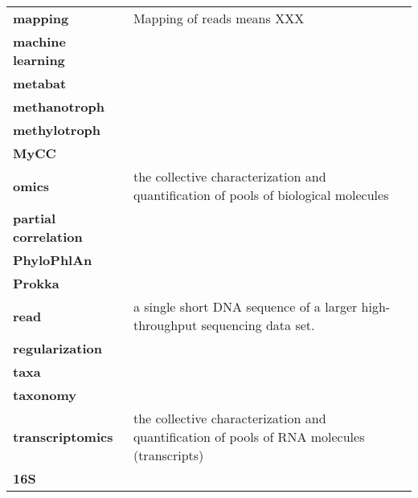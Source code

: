 \begin{longtable}{ p{}  p{} }
\textbf{mapping} & Mapping of reads means XXX \\
\textbf{machine learning} &  \\
\textbf{metabat} &  \\
\textbf{methanotroph} &  \\
\textbf{methylotroph} &  \\
\textbf{MyCC} &  \\
\textbf{omics} & the collective characterization and quantification of pools of biological molecules \\
\textbf{partial correlation} &  \\
\textbf{PhyloPhlAn} &  \\
\textbf{Prokka} &  \\
\textbf{read} & a single short DNA sequence of a larger high-throughput sequencing data set. \\
\textbf{regularization} &  \\
\textbf{taxa} &  \\
\textbf{taxonomy} &  \\
\textbf{transcriptomics} & the collective characterization and quantification of pools of RNA molecules (transcripts) \\
\textbf{16S} &  \\
\end{longtable}

